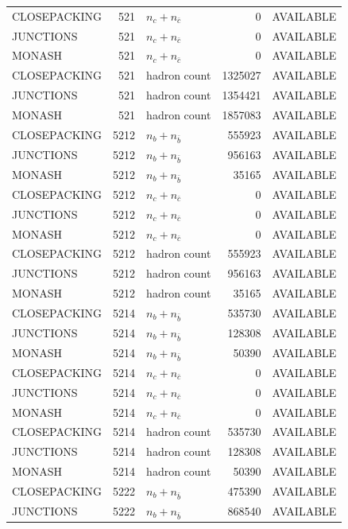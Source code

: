 \begin{landscape}
\begin{longtable}{@{}lrlrl@{}}
CLOSEPACKING & 521 & $n_c+n_{\bar c}$ & \num{0} & AVAILABLE \\
JUNCTIONS & 521 & $n_c+n_{\bar c}$ & \num{0} & AVAILABLE \\
MONASH & 521 & $n_c+n_{\bar c}$ & \num{0} & AVAILABLE \\
CLOSEPACKING & 521 & hadron count & \num{1325027} & AVAILABLE \\
JUNCTIONS & 521 & hadron count & \num{1354421} & AVAILABLE \\
MONASH & 521 & hadron count & \num{1857083} & AVAILABLE \\
CLOSEPACKING & 5212 & $n_b+n_{\bar b}$ & \num{555923} & AVAILABLE \\
JUNCTIONS & 5212 & $n_b+n_{\bar b}$ & \num{956163} & AVAILABLE \\
MONASH & 5212 & $n_b+n_{\bar b}$ & \num{35165} & AVAILABLE \\
CLOSEPACKING & 5212 & $n_c+n_{\bar c}$ & \num{0} & AVAILABLE \\
JUNCTIONS & 5212 & $n_c+n_{\bar c}$ & \num{0} & AVAILABLE \\
MONASH & 5212 & $n_c+n_{\bar c}$ & \num{0} & AVAILABLE \\
CLOSEPACKING & 5212 & hadron count & \num{555923} & AVAILABLE \\
JUNCTIONS & 5212 & hadron count & \num{956163} & AVAILABLE \\
MONASH & 5212 & hadron count & \num{35165} & AVAILABLE \\
CLOSEPACKING & 5214 & $n_b+n_{\bar b}$ & \num{535730} & AVAILABLE \\
JUNCTIONS & 5214 & $n_b+n_{\bar b}$ & \num{128308} & AVAILABLE \\
MONASH & 5214 & $n_b+n_{\bar b}$ & \num{50390} & AVAILABLE \\
CLOSEPACKING & 5214 & $n_c+n_{\bar c}$ & \num{0} & AVAILABLE \\
JUNCTIONS & 5214 & $n_c+n_{\bar c}$ & \num{0} & AVAILABLE \\
MONASH & 5214 & $n_c+n_{\bar c}$ & \num{0} & AVAILABLE \\
CLOSEPACKING & 5214 & hadron count & \num{535730} & AVAILABLE \\
JUNCTIONS & 5214 & hadron count & \num{128308} & AVAILABLE \\
MONASH & 5214 & hadron count & \num{50390} & AVAILABLE \\
CLOSEPACKING & 5222 & $n_b+n_{\bar b}$ & \num{475390} & AVAILABLE \\
JUNCTIONS & 5222 & $n_b+n_{\bar b}$ & \num{868540} & AVAILABLE \\

\end{longtable}
\end{landscape}
